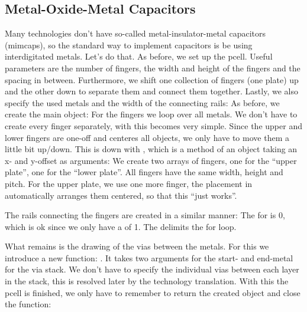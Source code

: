 \subsection{Metal-Oxide-Metal Capacitors}
Many technologies don't have so-called metal-insulator-metal capacitors (mimcaps), so the standard way to implement capacitors is be using interdigitated metals.
Let's do that. As before, we set up the pcell. Useful parameters are the number of fingers, the width and height of the fingers and the spacing in between.
Furthermore, we shift one collection of fingers (one plate) up and the other down to separate them and connect them together. Lastly, we also specify the used
metals and the width of the connecting rails:
As before, we create the main object:
For the fingers we loop over all metals. We don't have to create every finger separately, with  this becomes very simple. Since the upper
and lower fingers are one-off and  centeres all objects, we only have to move them a little bit up/down. This is down with
, which is a method of an object taking an x- and y-offset as arguments:
We create two arrays of fingers, one for the \enquote{upper plate}, one for the \enquote{lower plate}. All fingers have the same width, height and pitch. For the
upper plate, we use one more finger, the placement in  automatically arranges them centered, so that this \enquote{just works}.

The rails connecting the fingers are created in a similar manner:
The  for  is \num{0}, which is ok since we only have a  of \num{1}. The  delimits the for loop.

What remains is the drawing of the vias between the metals. For this we introduce a new  function: . It takes two
arguments for the start- and end-metal for the via stack. We don't have to specify the individual vias between each layer in the stack, this is resolved later by the
technology translation.
With this the pcell is finished, we only have to remember to return the created object and close the function:

